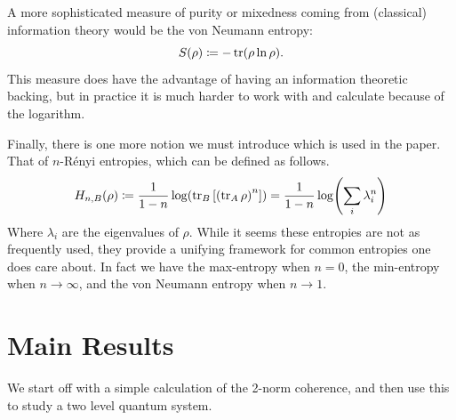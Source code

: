 \documentclass[11pt,english]{article}
\theoremstyle{definition}
\begin{document}
A more sophisticated measure of purity or mixedness coming from (classical) information theory would be the von Neumann entropy:
\begin{equation*}
	S(\rho)\coloneqq -\tr(\rho\ln\rho).
\end{equation*}
This measure does have the advantage of having an information theoretic backing, but in practice it is much harder to work with and calculate because of the logarithm.

Finally, there is one more notion we must introduce which is used in the paper. That of $n$-R\'enyi entropies, which can be defined as follows.
\begin{equation*}
	H_{n, B}(\rho)\coloneqq \frac{1}{1-n}\log(\tr_B\qty[\qty(\tr_A \rho)^n]) = \frac{1}{1-n}\log(\sum_i\lambda_i^n)
\end{equation*}
Where $\lambda_i$ are the eigenvalues of $\rho$. While it seems these entropies are not as frequently used, they provide a unifying framework for common entropies one does care about. In fact we have the max-entropy when $n = 0$, the min-entropy when $n\to\infty$, and the von Neumann entropy when $n \to 1$.


\section{Main Results}
We start off with a simple calculation of the 2-norm coherence, and then use this to study a two level quantum system.
\end{document}
